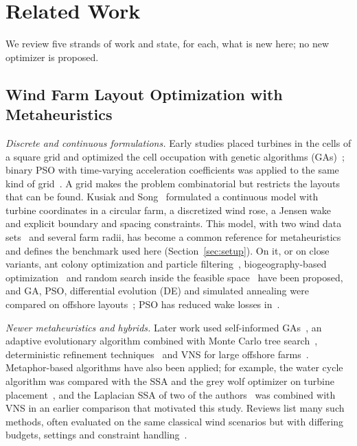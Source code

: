 \section{Related Work}
\label{sec:related}
We review five strands of work and state, for each, what is new here; no new optimizer is proposed.

\subsection{Wind Farm Layout Optimization with Metaheuristics}
\label{sec:related-wflop}
\emph{Discrete and continuous formulations.} Early studies placed turbines in the cells of a square grid and optimized the cell occupation with genetic algorithms (GAs)~\cite{Mosetti1994,Grady2005}; binary PSO with time-varying acceleration coefficients was applied to the same kind of grid~\cite{Pookpunt2013}. A grid makes the problem combinatorial but restricts the layouts that can be found. Kusiak and Song~\cite{Kusiak2010} formulated a continuous model with turbine coordinates in a circular farm, a discretized wind rose, a Jensen wake~\cite{Jensen1983,Katic1986} and explicit boundary and spacing constraints. This model, with two wind data sets~\cite{Kusiak2010,Bansal2017} and several farm radii, has become a common reference for metaheuristics and defines the benchmark used here (Section~\ref{sec:setup}). On it, or on close variants, ant colony optimization and particle filtering~\cite{Eroglu2012,Eroglu2013}, biogeography-based optimization~\cite{Bansal2017} and random search inside the feasible space~\cite{Feng2015} have been proposed, and GA, PSO, differential evolution (DE) and simulated annealing were compared on offshore layouts~\cite{Elkinton2008}; PSO has reduced wake losses in~\cite{Asaah2021}.

\emph{Newer metaheuristics and hybrids.} Later work used self-informed GAs~\cite{Ju2019}, an adaptive evolutionary algorithm combined with Monte Carlo tree search~\cite{Bai2022}, deterministic refinement techniques~\cite{Nagpal2021} and VNS for large offshore farms~\cite{Cazzaro2022}. Metaphor-based algorithms have also been applied; for example, the water cycle algorithm was compared with the SSA and the grey wolf optimizer on turbine placement~\cite{Rezk2019}, and the Laplacian SSA of two of the authors~\cite{Solanki2023} was combined with VNS in an earlier comparison that motivated this study. Reviews list many such methods, often evaluated on the same classical wind scenarios but with differing budgets, settings and constraint handling~\cite{Azlan2021}.

